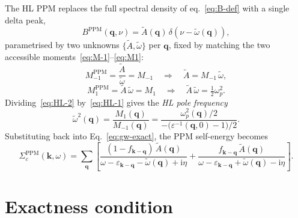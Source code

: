 \documentclass[11pt]{article}
\newcommand{\bq}{\mathbf{q}}
\newcommand{\bk}{\mathbf{k}}
\newcommand{\wt}{\tilde{\omega}}
\newcommand{\eps}{\varepsilon}
\newcommand{\Sig}{\Sigma}
\newcommand{\ii}{\mathrm{i}}
\begin{document}
The HL PPM replaces the full spectral density of eq.~\eqref{eq:B-def} with a single delta peak,
\begin{equation}
  B^\text{PPM}(\bq,\nu) = \tilde{A}(\bq)\,\delta(\nu-\wt(\bq)),
  \label{eq:B-ppm}
\end{equation}
parametrised by two unknowns $\{\tilde{A},\wt\}$ per $\bq$, fixed by
matching the two accessible moments~\eqref{eq:M-1}--\eqref{eq:M1}:
\begin{equation}
  M_{-1}^\text{PPM} = \frac{\tilde{A}}{\wt}
    = M_{-1} \quad\Longrightarrow\quad
    \tilde{A} = M_{-1}\,\wt,
  \label{eq:HL-1}
\end{equation}
\begin{equation}
  M_1^\text{PPM} = \tilde{A}\,\wt
    = M_1 \quad\Longrightarrow\quad
    \tilde{A}\,\wt = \tfrac{1}{2}\omega_p^2.
  \label{eq:HL-2}
\end{equation}
Dividing~\eqref{eq:HL-2} by~\eqref{eq:HL-1} gives the \emph{HL pole frequency}
\begin{equation}
  \boxed{
  \wt^2(\bq) = \frac{M_1(\bq)}{M_{-1}(\bq)}
             = \frac{\omega_p^2(\bq)/2}
                    {-\bigl(\eps^{-1}(\bq,0)-1\bigr)/2}.
  }
  \label{eq:HL-pole}
\end{equation}
Substituting back into Eq.~\eqref{eq:gw-exact}, the PPM self-energy
becomes
\begin{equation}
  \Sig_c^\text{PPM}(\bk,\omega)
  = \sum_{\bq}
    \left[
      \frac{(1-f_{\bk-\bq})\,\tilde{A}(\bq)}
           {\omega - \eps_{\bk-\bq} - \wt(\bq) + \ii\eta}
     +\frac{f_{\bk-\bq}\,\tilde{A}(\bq)}
           {\omega - \eps_{\bk-\bq} + \wt(\bq) - \ii\eta}
    \right].
  \label{eq:gw-ppm}
\end{equation}

\section{Exactness condition}
\end{document}

